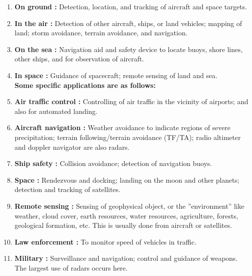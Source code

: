 \documentclass[14pt]{article} %
\begin{document}
 \begin{enumerate}
\item \textbf {On ground :} Detection, location, and tracking of aircraft and space targets.

\item \textbf {In the air :} Detection of other aircraft, ships, or land vehicles; mapping of land; storm avoidance, terrain avoidance, and navigation.

\item \textbf {On the sea :} Navigation aid and safety device to locate buoys, shore lines, other ships, and for observation of aircraft.

\item \textbf {In space :} Guidance of spacecraft; remote sensing of land and sea.
\newline
\\ \textbf{Some specific applications are as follows:}

\item \textbf {Air traffic control :} Controlling of air traffic in the vicinity of airports; and also for automated landing.

\item \textbf {Aircraft navigation :} Weather avoidance to indicate regions of severe precipitation; terrain following/terrain avoidance (TF/TA); radio altimeter and doppler navigator are also radars.

\item \textbf {Ship safety :} Collision avoidance; detection of navigation buoys.

\item \textbf {Space :} Rendezvous and docking; landing on the moon and other planets; detection and tracking of satellites.

\item \textbf {Remote sensing :} Sensing of geophysical object, or the ”environment” like weather, cloud cover, earth resources, water resources, agriculture, forests, geological formation, etc. This is usually done from aircraft or satellites.

\item \textbf {Law enforcement :} To monitor speed of vehicles in traffic.

\item \textbf {Military :} Surveillance and navigation; control and guidance of weapons. The largest use of radars occurs here.

\end{enumerate}
\end{document}
